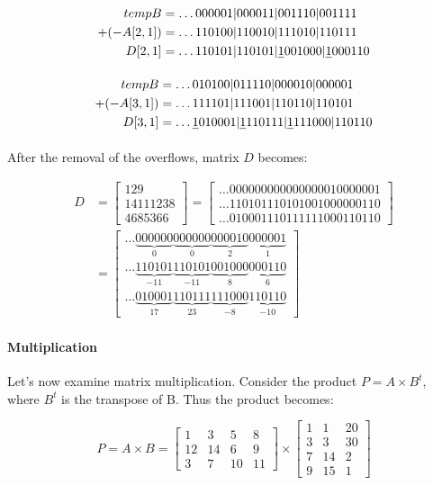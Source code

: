 \documentclass[12pt]{article}
\begin{document}
\begin{align*}
	tempB &= \ldots000001|000011|001110|001111\\
+(-A[2,1])&= \ldots110100|110010|111010|110111\\ 
D[2,1]	  &= \ldots110101|110101|\sout{1}001000|\sout{1}000110
\end{align*}

\begin{align*}
tempB	  &= \ldots010100|011110|000010|000001 \\
+(-A[3,1])&= \ldots111101|111001|110110|110101\\ 
D[3,1]	  &= \ldots\sout{1}010001|\sout{1}110111|\sout{1}111000|110110
\end{align*}

After the removal of the overflows, matrix $D$ becomes:

\begin{align}
	D &= \begin{bmatrix}
			129\\ 
			14111238\\ 
			4685366
		\end{bmatrix} 
        =
        \begin{bmatrix}
   			\ldots000000000000000010000001 \\
			\ldots110101110101001000000110 \\
			\ldots010001110111111000110110
		\end{bmatrix}
      \\\nonumber
        &=  \begin{bmatrix}
 \ldots\underbrace{000000}_{0}\underbrace{000000}_{0}\underbrace{000010}_{2}
\underbrace{000001}_{1} \\ 			 
 \ldots\underbrace{110101}_{-11}\underbrace{110101}_{-11}\underbrace{001000}_{8}
\underbrace{000110}_{6} \\
 \ldots\underbrace{010001}_{17}\underbrace{110111}_{23}\underbrace{111000}_{-8}
\underbrace{110110}_{-10}
		\end{bmatrix}
\end{align}

\paragraph{Multiplication}
Let's now examine matrix multiplication. Consider the product $P = A \times
B^{t}$, where $B^t$ is the transpose of B. Thus the product becomes:

\begin{equation}
	P = A \times B = \begin{bmatrix}
			1 & 3 & 5 & 8\\ 
			12 &14  & 6 & 9\\ 
			3 & 7 & 10 & 11
		\end{bmatrix}
        \times
		\begin{bmatrix}
			1 & 1  & 20\\ 
            3 & 3  & 30\\
            7 & 14 & 2\\
            9 & 15 & 1
		\end{bmatrix}
\end{equation}
\end{document}
